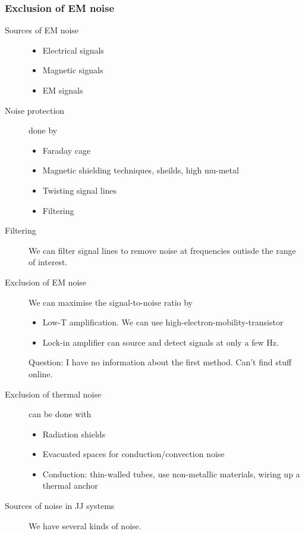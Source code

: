 \subsubsection{Exclusion of EM noise}
\begin{description}
\item[Sources of EM noise]
\begin{itemize}
\item Electrical signals
\item Magnetic signals
\item EM signals
\end{itemize}


\item[Noise protection] done by 
\begin{itemize}
\item Faraday cage
\item Magnetic shielding techniques, sheilds, high mu-metal
\item Twisting signal lines
\item Filtering
\end{itemize}

\item[Filtering] We can filter signal lines to remove noise at frequencies outisde the range of interest. 

\item[Exclusion of EM noise]
We can maximise the signal-to-noise ratio by
\begin{itemize}
\item Low-T amplification. We can use high-electron-mobility-transistor
\item Lock-in amplifier can source and detect signals at only a few Hz. 
\end{itemize}

Question: I have no information about the first method. Can't find stuff online. 

\item[Exclusion of thermal noise] can be done with 
\begin{itemize}
\item Radiation shields
\item Evacuated spaces for conduction/convection noise
\item Conduction: thin-walled tubes, use non-metallic materials, wiring up a thermal anchor
\end{itemize}

\item[Sources of noise in JJ systems] We have several kinds of noise. 


\end{description}
